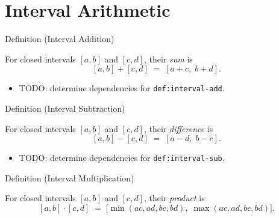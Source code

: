 
\section{Interval Arithmetic}

\begin{definitionbox}{Definition (Interval Addition)}
\begin{definition}\label{def:interval-add}
For closed intervals $[a,b]$ and $[c,d]$, their \emph{sum} is
\[
  [a,b] + [c,d] \;=\; [a+c,\; b+d].
\]
\end{definition}
\end{definitionbox}

\begin{dependencies}
\begin{itemize}
  \item TODO: determine dependencies for \texttt{def:interval-add}.
\end{itemize}
\end{dependencies}

\begin{definitionbox}{Definition (Interval Subtraction)}
\begin{definition}\label{def:interval-sub}
For closed intervals $[a,b]$ and $[c,d]$, their \emph{difference} is
\[
  [a,b] - [c,d] \;=\; [a-d,\; b-c].
\]
\end{definition}
\end{definitionbox}

\begin{dependencies}
\begin{itemize}
  \item TODO: determine dependencies for \texttt{def:interval-sub}.
\end{itemize}
\end{dependencies}

\begin{definitionbox}{Definition (Interval Multiplication)}
\begin{definition}\label{def:interval-mult}
For closed intervals $[a,b]$ and $[c,d]$, their \emph{product} is
\[
  [a,b] \cdot [c,d] \;=\;
  \bigl[\min(ac, ad, bc, bd),\; \max(ac, ad, bc, bd)\bigr].
\]
\end{definition}
\end{definitionbox}

